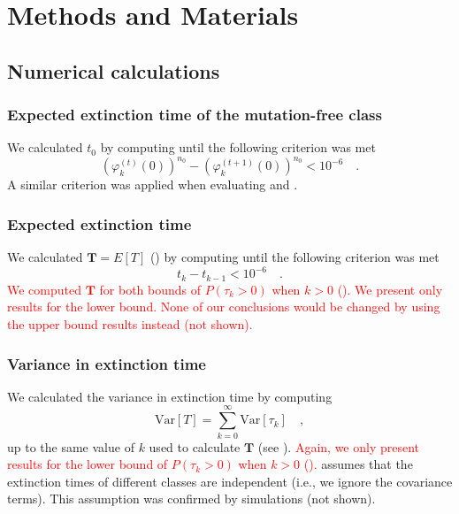 \documentclass[9pt,lineno]{elife}
\newcommand{\red}{\textcolor{red}}
\begin{document}




\section{Methods and Materials}




\subsection{Numerical calculations}

\subsubsection{Expected extinction time of the mutation-free class}
We calculated $t_0$ by computing  until the following criterion was met 
%
\begin{equation*}
\left(\varphi_{k}^{(t)}(0)\right)^{n_{0}} - \left(\varphi_{k}^{(t+1)}(0)\right)^{n_{0}} < 10^{-6} \quad .
\end{equation*}
%
A similar criterion was applied when evaluating  and . 

\subsubsection{Expected extinction time}
We calculated $\mathbf{T}=E[T]$ () by computing  until the following criterion was met 
%
\begin{equation*}
t_k - t_{k-1} < 10^{-6} \quad .
\end{equation*}
%
\red{We computed $\mathbf{T}$ for both bounds of $P(\tau_{k} > 0)$ when $k>0$ ().  We present only results for the lower bound.  None of our conclusions would be changed by using the upper bound results instead (not shown).}

\subsubsection{Variance in extinction time}

We calculated the variance in extinction time by computing 
%
\begin{equation}
    \mathrm{Var}[T] = \sum_{k=0}^\infty \mathrm{Var}[\tau_k] \quad ,
    \label{eq:varT}
\end{equation}
%
up to the same value of $k$ used to calculate $\mathbf{T}$ (see ).  
\red{Again, we only present results for the lower bound of $P(\tau_{k} > 0)$ when $k>0$ ().}
 assumes that the extinction times of different classes are independent (i.e., we ignore the covariance terms).  
This assumption was confirmed by simulations (not shown).
\end{document}
